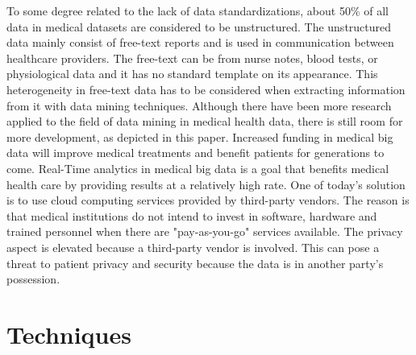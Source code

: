 To some degree related to the lack of data standardizations, about 50\% of all data in medical datasets are considered to be unstructured\cite{wp}. The unstructured data mainly consist of free-text reports and is used in communication between healthcare providers. The free-text can be from nurse notes, blood tests, or physiological data and it has no standard template on its appearance. This heterogeneity in free-text data has to be considered when extracting information from it with data mining techniques. 
 Although there have been more research applied to the field of data mining in medical health data, there is still room for more development, as depicted in this paper. Increased funding in medical big data will improve medical treatments and benefit patients for generations to come. 
Real-Time analytics in medical big data is a goal that benefits medical health care by providing results at a relatively high rate.\cite{kek} One of today’s solution is to use cloud computing services provided by third-party vendors. The reason is that medical institutions do not intend to invest in software, hardware and trained personnel when there are "pay-as-you-go" services available\cite{motivation1}. The privacy aspect is elevated because a third-party vendor is involved.
This can pose a threat to patient privacy and security because the data is in another party's possession.


\section{Techniques}

